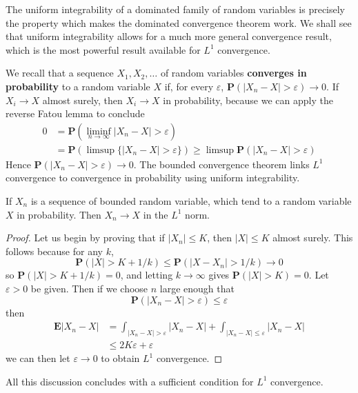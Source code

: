 The uniform integrability of a dominated family of random variables is precisely the property which makes the dominated convergence theorem work. We shall see that uniform integrability allows for a much more general convergence result, which is the most powerful result available for $L^1$ convergence.

We recall that a sequence $X_1, X_2, \dots$ of random variables {\bf converges in probability} to a random variable $X$ if, for every $\varepsilon$, $\mathbf{P}(|X_n - X| > \varepsilon) \to 0$. If $X_i \to X$ almost surely, then $X_i \to X$ in probability, because we can apply the reverse Fatou lemma to conclude
%
\begin{align*}
    0 &= \mathbf{P} \left( \liminf_{n \to \infty} |X_n - X| > \varepsilon \right)\\
    &= \mathbf{P} \left( \limsup \{ |X_n - X| > \varepsilon \} \right) \geq \limsup \mathbf{P}(|X_n - X| > \varepsilon)
\end{align*}
%
Hence $\mathbf{P}(|X_n - X| > \varepsilon) \to 0$. The bounded convergence theorem links $L^1$ convergence to convergence in probability using uniform integrability.

\begin{theorem}
    If $X_n$ is a sequence of bounded random variable, which tend to a random variable $X$ in probability. Then $X_n \to X$ in the $L^1$ norm.
\end{theorem}
\begin{proof}
    Let us begin by proving that if $|X_n| \leq K$, then $|X| \leq K$ almost surely. This follows because for any $k$,
    \[ \mathbf{P}(|X| > K + 1/k) \leq \mathbf{P}(|X - X_n| > 1/k) \to 0 \]
    so $\mathbf{P}(|X| > K + 1/k) = 0$, and letting $k \to \infty$ gives $\mathbf{P}(|X| > K) = 0$. Let $\varepsilon > 0$ be given. Then if we choose $n$ large enough that
    \[ \mathbf{P}(|X_n - X| > \varepsilon) \leq \varepsilon \]
    then
    \begin{align*}
        \mathbf{E}|X_n - X| &= \int_{|X_n - X| > \varepsilon} |X_n - X| + \int_{|X_n - X| \leq \varepsilon} |X_n - X|\\
        &\leq 2K\varepsilon + \varepsilon
    \end{align*}
    we can then let $\varepsilon \to 0$ to obtain $L^1$ convergence.
\end{proof}

All this discussion concludes with a sufficient condition for $L^1$ convergence.

